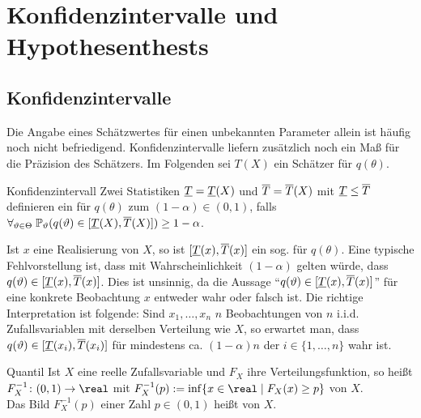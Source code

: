 \section{%
    Konfidenzintervalle und Hypothesenthests%
}

\subsection{%
    Konfidenzintervalle%
}

\begin{Bem}
    Die Angabe eines Schätzwertes für einen unbekannten Parameter allein ist häufig noch nicht
    befriedigend.
    Konfidenzintervalle liefern zusätzlich noch ein Maß für die Präzision des Schätzers.
    Im Folgenden sei $T(X)$ ein Schätzer für $q(\theta)$.
\end{Bem}

\begin{Def}{Konfidenzintervall}
    Zwei Statistiken $\underline{T} = \underline{T}(X)$ und $\overline{T} = \overline{T}(X)$ mit $\underline{T} \le \overline{T}$ definieren
    ein  für $q(\theta)$ zum
     $(1 - \alpha) \in (0, 1)$, falls\\
    $\forall_{\vartheta \in \Theta}\; \mathbb{P}_\vartheta(q(\vartheta) \in [\underline{T}(X), \overline{T}(X)]) \ge 1 - \alpha$.
\end{Def}

\begin{Bem}
    Ist $x$ eine Realisierung von $X$, so ist $[\underline{T}(x), \overline{T}(x)]$ ein sog.
     für $q(\theta)$.
    Eine typische Fehlvorstellung ist,
    dass mit Wahrscheinlichkeit $(1 - \alpha)$ gelten würde, dass $q(\vartheta) \in [\underline{T}(x), \overline{T}(x)]$.
    Dies ist unsinnig, da die Aussage "`$q(\vartheta) \in [\underline{T}(x), \overline{T}(x)]$"'
    für eine konkrete Beobachtung $x$ entweder wahr oder falsch ist.
    Die richtige Interpretation ist folgende:
    Sind $x_1, \dotsc, x_n$ $n$ Beobachtungen von $n$ i.i.d. Zufallsvariablen mit derselben
    Verteilung wie $X$, so erwartet man, dass $q(\vartheta) \in [\underline{T}(x_i), \overline{T}(x_i)]$ für
    mindestens ca. $(1 - \alpha)n$ der $i \in \{1, \dotsc, n\}$ wahr ist.
\end{Bem}

\begin{Def}{Quantil}
    Ist $X$ eine reelle Zufallsvariable und $F_X$ ihre Verteilungsfunktion, so heißt\\
    $F_X^{-1}\colon (0, 1) \rightarrow \real$ mit
    $F_X^{-1}(p) := \inf\{x \in \real \;|\; F_X(x) \ge p\}$
     von $X$.\\
    Das Bild $F_X^{-1}(p)$ einer Zahl $p \in (0, 1)$ heißt  von $X$.
\end{Def}

